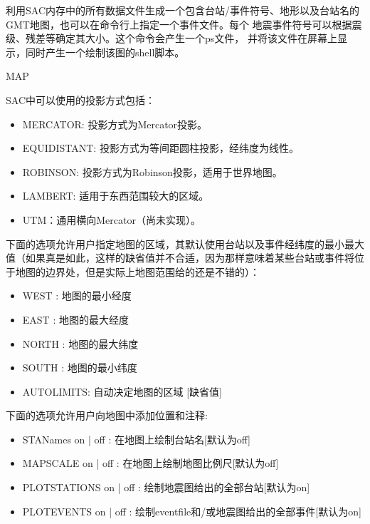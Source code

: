 \label{cmd:map}

利用SAC内存中的所有数据文件生成一个包含台站/事件符号、地形以及台站名的
GMT地图，也可以在命令行上指定一个事件文件。每个
地震事件符号可以根据震级、残差等确定其大小。这个命令会产生一个ps文件，
并将该文件在屏幕上显示，同时产生一个绘制该图的shell脚本。

MAP

SAC中可以使用的投影方式包括：
\begin{itemize}
\item MERCATOR:	投影方式为Mercator投影。
\item EQUIDISTANT: 投影方式为等间距圆柱投影，经纬度为线性。
\item ROBINSON: 投影方式为Robinson投影，适用于世界地图。
\item LAMBERT: 适用于东西范围较大的区域。
\item UTM：通用横向Mercator（尚未实现）。
\end{itemize}

下面的选项允许用户指定地图的区域，其默认使用台站以及事件经纬度的最小最大值（如果真是如此，这样的缺省值并不合适，因为那样意味着某些台站或事件将位于地图的边界处，但是实际上地图范围给的还是不错的）：
\begin{itemize}
\item WEST :  地图的最小经度 
\item EAST : 地图的最大经度 
\item NORTH : 地图的最大纬度 
\item SOUTH : 地图的最小纬度 
\item AUTOLIMITS:  自动决定地图的区域 [缺省值] 
\end{itemize}
  
下面的选项允许用户向地图中添加位置和注释:
\begin{itemize}
\item STANames on | off :  在地图上绘制台站名[默认为off]
\item MAPSCALE on | off :  在地图上绘制地图比例尺[默认为off]
\item PLOTSTATIONS on | off : 绘制地震图给出的全部台站[默认为on]
\item PLOTEVENTS on | off : 绘制eventfile和/或地震图给出的全部事件[默认为on]
\end{itemize}

